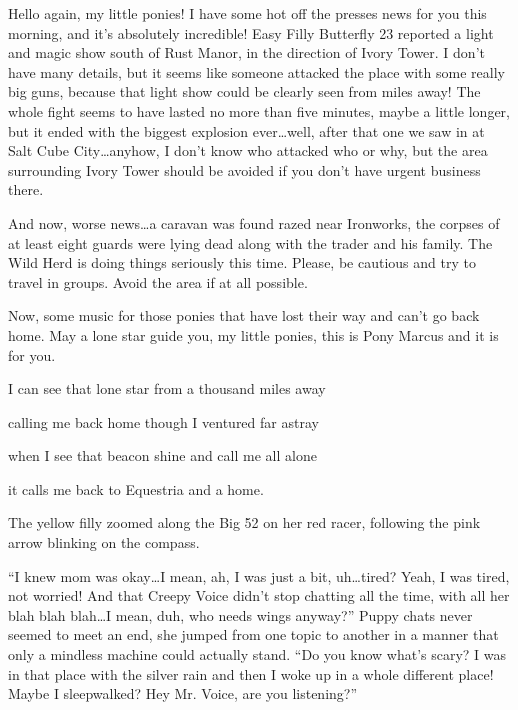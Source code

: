 \horizonline

{\rt Hello again, my little ponies! I have some hot off the presses news for you this morning, and it's absolutely incredible! Easy Filly Butterfly 23 reported a light and magic show south of Rust Manor, in the direction of Ivory Tower. I don't have many details, but it seems like someone attacked the place with some really big guns, because that light show could be clearly seen from miles away! The whole fight seems to have lasted no more than five minutes, maybe a little longer, but it ended with the biggest explosion ever\dots well, after that one we saw in at Salt Cube City\dots anyhow, I don't know who attacked who or why, but the area surrounding Ivory Tower should be avoided if you don't have urgent business there.

And now, worse news\dots a caravan was found razed near Ironworks, the corpses of at least eight guards were lying dead along with the trader and his family. The Wild Herd is doing things seriously this time. Please, be cautious and try to travel in groups. Avoid the area if at all possible.

Now, some music for those ponies that have lost their way and can't go back home. May a lone star guide you, my little ponies, this is Pony Marcus and it is for you.}

\begin{song}
    I can see that lone star from a thousand miles away

    calling me back home though I ventured far astray

    when I see that beacon shine and call me all alone

    it calls me back to Equestria and a home.
\end{song}

\horizonline


The yellow filly zoomed along the Big 52 on her red racer, following the pink arrow blinking on the compass.

``I knew mom was okay\dots I mean, ah, I was just a bit, uh\dots tired? Yeah, I was tired, not worried! And that Creepy Voice didn't stop chatting all the time, with all her blah blah blah\dots I mean, duh, who needs wings anyway?'' Puppy chats never seemed to meet an end, she jumped from one topic to another in a manner that only a mindless machine could actually stand. ``Do you know what's scary? I was in that place with the silver rain and then I woke up in a whole different place! Maybe I sleepwalked? Hey Mr. Voice, are you listening?''

